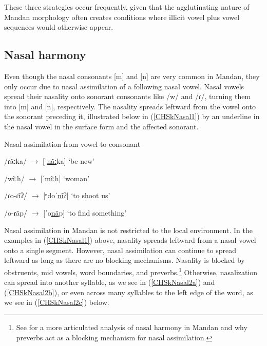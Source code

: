 These three strategies occur frequently, given that the agglutinating nature of Mandan morphology often creates conditions where illicit vowel plus vowel sequences would otherwise appear.

\subsection{Nasal harmony}\label{CHSk2.3}
\largerpage
Even though the nasal consonants [m] and [n] are very common in Mandan, they only occur due to nasal assimilation of a following nasal vowel. Nasal vowels spread their nasality onto sonorant consonants like /w/ and /ɾ/, turning them into [m] and [n], respectively. The nasality spreads leftward from the vowel onto the sonorant preceding it, illustrated below in (\ref{CHSkNasal1}) by an underline in the nasal vowel in the surface form and the affected sonorant.

\begin{exe}
    \item\label{CHSkNasal1} Nasal assimilation from vowel to consonant

    \begin{xlist}
        \item\label{CHSkNasal1a} /ɾãːka/ $\to$ [ˈ\uline{nãː}ka] `be new'
        \item\label{CHSkNasal1b} /wĩːh/ $\to$ [ˈ\uline{mĩː}h] `woman'
        \item\label{CHSkNasal1c} /ɾo-ɾĩʔ/ $\to$ [ⁿdoˈ\uline{nĩ}ʔ] `to shoot us'
        \item\label{CHSkNasal1d} /o-ɾãp/ $\to$ [ˈo\uline{nã}p] `to find something'
    \end{xlist}
\end{exe}

Nasal assimilation in Mandan is not restricted to the local environment. In the examples in (\ref{CHSkNasal1}) above, nasality spreads leftward from a nasal vowel onto a single segment. However, nasal assimilation can continue to spread leftward as long as there are no blocking mechanisms. Nasality is blocked by obstruents, mid vowels, word boundaries, and preverbs.\footnote{See  for a more articulated analysis of nasal harmony in Mandan and why preverbs act as a blocking mechanism for nasal assimilation.} Otherwise, nasalization can spread into another syllable, as we see in (\ref{CHSkNasal2a}) and (\ref{CHSkNasal2b}), or even across many syllables to the left edge of the word, as we see in (\ref{CHSkNasal2c}) below.

